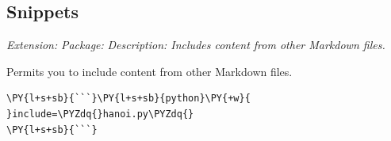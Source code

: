 \documentclass[a4paper,twoside]{article}
\begin{document}
\subsection{Snippets}
\emph{Extension: }
\emph{Package: }
\emph{Description: Includes content from other Markdown files.}

Permits you to include content from other Markdown files.
\begin{tscode}[lang=md, engine=pygments]
\begin{Verbatim}[commandchars=\\\{\},breaklines, breakanywhere, commandchars=\\\{\}]
\PY{l+s+sb}{```}\PY{l+s+sb}{python}\PY{+w}{ }include=\PYZdq{}hanoi.py\PYZdq{}
\PY{l+s+sb}{```}
\end{Verbatim}
\end{tscode}
\end{document}
